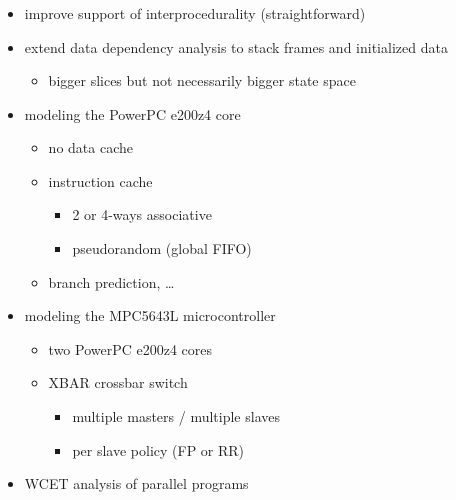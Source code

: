 \documentclass{beamer}
\begin{document}
  \begin{frame}
    \frametitle{\secname}

    \begin{itemize}
      \item improve support of interprocedurality (straightforward) %
      \item extend data dependency analysis to stack frames and initialized data
      \begin{itemize}
        \item bigger slices but not necessarily bigger state space
      \end{itemize}

      \vspace{1em}
      \item modeling the PowerPC e200z4 core
        \begin{itemize}
          \item no data cache
          \item instruction cache
            \begin{itemize}
              \item 2 or 4-ways associative
              \item pseudorandom (global FIFO)
            \end{itemize}
          \item branch prediction, \dots
        \end{itemize}
      \item modeling the MPC5643L microcontroller
        \begin{itemize}
          \item two PowerPC e200z4 cores
          \item XBAR crossbar switch
            \begin{itemize}
              \item multiple masters / multiple slaves
              \item per slave policy (FP or RR)
            \end{itemize}
        \end{itemize}

      \vspace{1em}
      \item WCET analysis of parallel programs
    \end{itemize}
  \end{frame}
\end{document}
